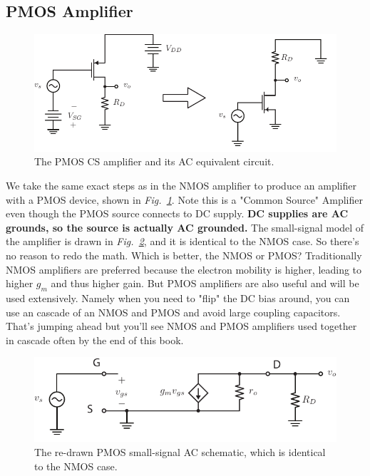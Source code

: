 \subsection{PMOS Amplifier}
\begin{figure}[tb]
\begin{center}
\includegraphics[scale=1]{cs_amp_pmos_ss1}
\end{center}
\caption{The PMOS CS amplifier and its AC equivalent circuit.}
\label{fig:cs_amp_pmos_ss1}
\end{figure}
We take the same exact steps as in the NMOS amplifier to produce an amplifier with a PMOS device, shown in \emph{Fig.~\ref{fig:cs_amp_pmos_ss1}}.  Note this is a "Common Source" Amplifier even though the PMOS source connects to DC supply.  \textbf{DC supplies are AC grounds, so the source is actually AC grounded.}   The small-signal model of the amplifier is drawn in \emph{Fig.~\ref{fig:csamp_pmos_ss}}, and it is identical to the NMOS case.  So there's no reason to redo the math.
Which is better, the NMOS or PMOS?  Traditionally NMOS amplifiers are preferred because the electron mobility is higher, leading to higher $g_m$ and thus higher gain.  But PMOS amplifiers are also useful and will be used extensively.  Namely when you need to "flip" the DC bias around, you can use an cascade of an NMOS and PMOS and avoid large coupling capacitors.  That's jumping ahead but you'll see NMOS and PMOS amplifiers used together in cascade often by the end of this book.  
\begin{figure}[tb]
\centering
\includegraphics[scale=1]{csamp_pmos_ss}
\caption{The re-drawn PMOS small-signal AC schematic, which is identical to the NMOS case.} \label{fig:csamp_pmos_ss}
\end{figure}
